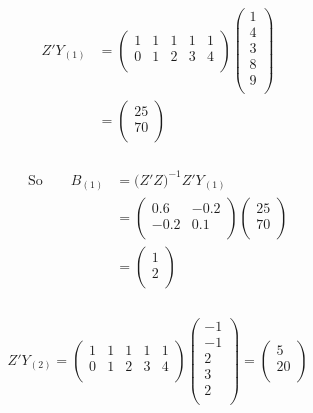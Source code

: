 \documentclass[11pt,a4paper]{article}
\theoremstyle{definition}
\begin{document}
\begin{align*}
Z'Y_{(1)} & = 
\begin{pmatrix}
1 & 1 & 1 & 1 & 1\\
0 & 1 & 2 & 3 & 4\\
\end{pmatrix}
\begin{pmatrix}
1 \\ 4\\ 3\\ 8\\ 9\\
\end{pmatrix}\\
& = 
\begin{pmatrix}
25\\ 70\\
\end{pmatrix}\\
\end{align*}






\begin{align*}
\text{So}\qquad  \widehat{B}_{(1)} & = \big(Z'Z\big)^{-1}Z'Y_{(1)}\\
& = \begin{pmatrix}
0.6 & -0.2\\
-0.2 & 0.1\\
\end{pmatrix}
\begin{pmatrix}
25\\70\\
\end{pmatrix}\\
& = 
\begin{pmatrix}
1\\2\\
\end{pmatrix}\\\\
\end{align*}




$$Z'Y_{(2)} =
\begin{pmatrix}
1 & 1 & 1 & 1 & 1\\
0 & 1 & 2 & 3 & 4\\
\end{pmatrix}
\begin{pmatrix}
-1 \\ -1 \\ 2\\ 3\\ 2\\
\end{pmatrix}
=
\begin{pmatrix}
5\\20\\
\end{pmatrix}
$$
\end{document}
